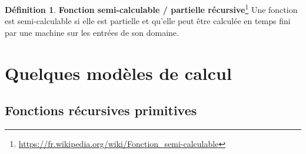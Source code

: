 \documentclass{book}
\theoremstyle{definition}
\newtheorem{definition}{Définition}
\numberwithin{lemma}{subsection}
\numberwithin{theorem}{subsection}
\numberwithin{definition}{subsection}
\numberwithin{proposition}{subsection}
\numberwithin{corollary}{subsection}
\numberwithin{property}{subsection}
\numberwithin{example}{subsection}
\numberwithin{heuristique}{subsection}
\numberwithin{scenario}{subsection}
\begin{document}
        \begin{definition}\textbf{Fonction semi-calculable / partielle récursive}\footnote{\url{https://fr.wikipedia.org/wiki/Fonction_semi-calculable}}
            Une fonction est semi-calculable si elle est partielle et qu'elle peut être calculée en temps fini par une machine sur les entrées de son domaine.
        \end{definition}
    
    \section{Quelques modèles de calcul}
        \subsection{Fonctions récursives primitives}
\end{document}
